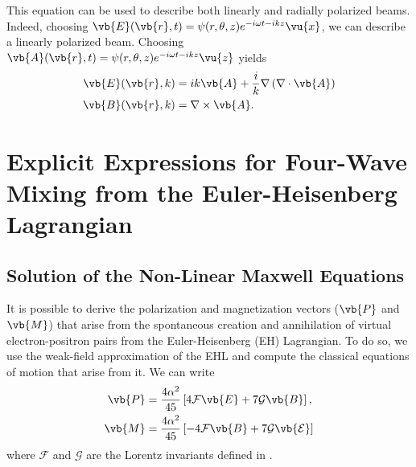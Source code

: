 \documentclass[11pt,SymmetricalJury]{inrsthesis/inrsthesis}
\begin{document}
This equation can be used to describe both linearly and radially polarized
beams. Indeed, choosing
$\vb{E}(\vb{r},t)=\psi(r,\theta,z)e^{-i\omega t -ikz}\vu{x}$, we can describe a
linearly polarized beam. Choosing
$\vb{A}(\vb{r},t)=\psi(r,\theta,z)e^{-i\omega t - ikz}\vu{z}$ yields
  \begin{align}
    \vb{E}(\vb{r},k) &= ik\vb{A}+\frac{i}{k}\nabla\left(\nabla\cdot\vb{A}\right) \\
    \vb{B}(\vb{r},k) &= \nabla\times\vb{A}.
  \end{align}



\chapter{Explicit Expressions for Four-Wave Mixing from the Euler-Heisenberg Lagrangian}


\section{Solution of the Non-Linear Maxwell Equations}
It is possible to derive the polarization and magnetization vectors ($\vb{P}$ and $\vb{M}$)
that arise from the spontaneous creation and annihilation of virtual electron-positron
pairs from the Euler-Heisenberg (EH) Lagrangian. To do so, we use the weak-field
approximation of the EHL and compute the classical equations of motion that arise
from it. We can write
  \begin{subequations}
  \begin{align}
    \vb{P} &= \frac{4\alpha^2}{45}\left[ 4\mathcal{F}\vb{E}+7\mathcal{G}\vb{B}\right], \label{eq:app.fwm.polarization}\\
    \vb{M} &= \frac{4\alpha^2}{45}\left[-4\mathcal{F}\vb{B}+7\mathcal{G{\vb{E}}}\right]
  \end{align}
  \end{subequations}
where $\mathcal{F}$ and $\mathcal{G}$ are the Lorentz invariants defined in \label{somewhere}.
\end{document}
